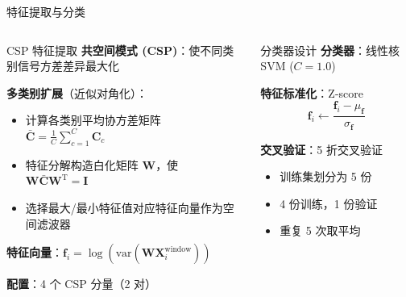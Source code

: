 {\begin{frame}{特征提取与分类}
    \begin{columns}[T]
        \begin{block}{CSP 特征提取}
            \footnotesize
            \vspace{0.1cm}
            \textbf{共空间模式 (CSP)}\cite{blankertz2008optimizing,mcfarland1997spatial}：使不同类别信号方差差异最大化
            
            \vspace{0.15cm}
            \textbf{多类别扩展}（近似对角化）：
            \begin{itemize}
                \item 计算各类别平均协方差矩阵 $\bar{\mathbf{C}} = \frac{1}{C}\sum_{c=1}^{C} \mathbf{C}_c$
                \item 特征分解构造白化矩阵 $\mathbf{W}$，使 $\mathbf{W} \bar{\mathbf{C}} \mathbf{W}^{\text{T}} = \mathbf{I}$
                \item 选择最大/最小特征值对应特征向量作为空间滤波器
            \end{itemize}

            \vspace{0.1cm}
            \textbf{特征向量}：$\mathbf{f}_i = \log \left( \text{var}(\mathbf{W} \mathbf{X}_i^{\text{window}}) \right)$
            
            \vspace{0.1cm}
            \textbf{配置}：4 个 CSP 分量（2 对）
        \end{block}

        \begin{block}{分类器设计}
            \footnotesize
            \textbf{分类器}\cite{lotte2007review}：线性核 SVM ($C=1.0$)
            
            \vspace{0.15cm}
            \textbf{特征标准化}：Z-score
            \begin{equation*}
                \mathbf{f}_i \leftarrow \frac{\mathbf{f}_i - \mu_{\mathbf{f}}}{\sigma_{\mathbf{f}}}
            \end{equation*}

            \vspace{0.15cm}
            \textbf{交叉验证}：5 折交叉验证
            \begin{itemize}
                \item 训练集划分为 5 份
                \item 4 份训练，1 份验证
                \item 重复 5 次取平均
            \end{itemize}
        \end{block}
    \end{columns}
\end{frame}

}
